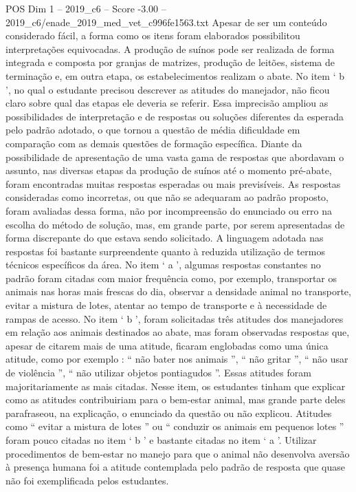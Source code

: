 \begin{textsample}{POS Dim 1 – 2019\_c6 – Score -3.00 – 2019\_c6/enade\_2019\_med\_vet\_c996fe1563.txt}
Apesar de ser um conteúdo considerado fácil, a forma como os itens foram elaborados possibilitou interpretações equivocadas.
A produção de suínos pode ser realizada de forma integrada e composta por granjas de matrizes, produção de leitões, sistema de terminação e, em outra etapa, os estabelecimentos realizam o abate.
No item ‘ b ’, no qual o estudante precisou descrever as atitudes do manejador, não ficou claro sobre qual das etapas ele deveria se referir.
Essa imprecisão ampliou as possibilidades de interpretação e de respostas ou soluções diferentes da esperada pelo padrão adotado, o que tornou a questão de média dificuldade em comparação com as demais questões de formação específica.
Diante da possibilidade de apresentação de uma vasta gama de respostas que abordavam o assunto, nas diversas etapas da produção de suínos até o momento pré-abate, foram encontradas muitas respostas esperadas ou mais previsíveis.
As respostas consideradas como incorretas, ou que não se adequaram ao padrão proposto, foram avaliadas dessa forma, não por incompreensão do enunciado ou erro na escolha do método de solução, mas, em grande parte, por serem apresentadas de forma discrepante do que estava sendo solicitado.
A linguagem adotada nas respostas foi bastante surpreendente quanto à reduzida utilização de termos técnicos específicos da área.
No item ‘ a ’, algumas respostas constantes no padrão foram citadas com maior frequência como, por exemplo, transportar os animais nas horas mais frescas do dia, observar a densidade animal no transporte, evitar a mistura de lotes, atentar ao tempo de transporte e à necessidade de rampas de acesso.
No item ‘ b ’, foram solicitadas três atitudes dos manejadores em relação aos animais destinados ao abate, mas foram observadas respostas que, apesar de citarem mais de uma atitude, ficaram englobadas como uma única atitude, como por exemplo : “ não bater nos animais ”, “ não gritar ”, “ não usar de violência ”, “ não utilizar objetos pontiagudos ”.
Essas atitudes foram majoritariamente as mais citadas.
Nesse item, os estudantes tinham que explicar como as atitudes contribuiriam para o bem-estar animal, mas grande parte deles parafraseou, na explicação, o enunciado da questão ou não explicou.
Atitudes como “ evitar a mistura de lotes ” ou “ conduzir os animais em pequenos lotes ” foram pouco citadas no item ‘ b ’ e bastante citadas no item ‘ a ’.
Utilizar procedimentos de bem-estar no manejo para que o animal não desenvolva aversão à presença humana foi a atitude contemplada pelo padrão de resposta que quase não foi exemplificada pelos estudantes.

\end{textsample}
